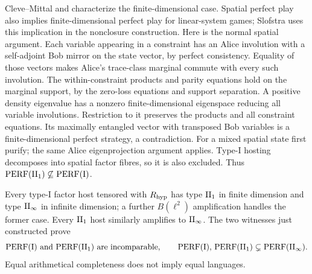 Cleve--Mittal \cite{CM} and \cite[Theorem~5]{CLS} characterize the finite-dimensional case. Spatial perfect play also implies finite-dimensional perfect play for linear-system games; Slofstra \cite{SlofstraNonclosed} uses this implication in the nonclosure construction. Here is the normal spatial argument. Each variable appearing in a constraint has an Alice involution with a self-adjoint Bob mirror on the state vector, by perfect consistency. Equality of those vectors makes Alice's trace-class marginal commute with every such involution. The within-constraint products and parity equations hold on the marginal support, by the zero-loss equations and support separation. A positive density eigenvalue has a nonzero finite-dimensional eigenspace reducing all variable involutions. Restriction to it preserves the products and all constraint equations. Its maximally entangled vector with transposed Bob variables is a finite-dimensional perfect strategy, a contradiction. For a mixed spatial state first purify; the same Alice eigenprojection argument applies. Type-I hosting decomposes into spatial factor fibres, so it is also excluded. Thus $\mathrm{PERF}(\mathrm{II}_1)\not\subseteq\mathrm{PERF}(\mathrm I)$.

Every type-I factor host tensored with $R_{\rm hyp}$ has type $\mathrm{II}_1$ in finite dimension and type $\mathrm{II}_\infty$ in infinite dimension; a further $B(\ell^2)$ amplification handles the former case. Every $\mathrm{II}_1$ host similarly amplifies to $\mathrm{II}_\infty$. The two witnesses just constructed prove
\[
 \perf(\mathrm I)\ \text{and}\ \perf(\II_1)
 \text{ are incomparable},\qquad
 \perf(\mathrm I),\,\perf(\II_1)
 \subsetneq\perf(\II_\infty).
\]
Equal arithmetical completeness does not imply equal languages.

